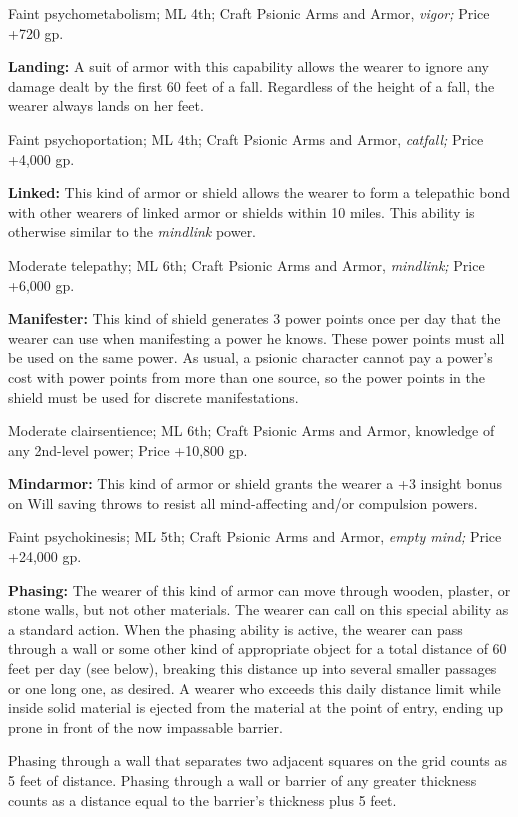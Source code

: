 \documentclass{article}
\begin{document}
Faint psychometabolism; ML 4th; Craft Psionic Arms and Armor, \textit{vigor; }Price 
+720 gp.

\textbf{Landing:} A suit of armor with this capability allows the wearer to ignore 
any damage dealt by the first 60 feet of a fall. Regardless of the height of a 
fall, the wearer always lands on her feet.

Faint psychoportation; ML 4th; Craft Psionic Arms and Armor, \textit{catfall; }Price 
+4,000 gp.

\textbf{Linked:} This kind of armor or shield allows the wearer to form a telepathic 
bond with other wearers of linked armor or shields within 10 miles. This ability 
is otherwise similar to the \textit{mindlink }power.

Moderate telepathy; ML 6th; Craft Psionic Arms and Armor, \textit{mindlink; }Price 
+6,000 gp.

\textbf{Manifester:} This kind of shield generates 3 power points once per day 
that the wearer can use when manifesting a power he knows. These power points must 
all be used on the same power. As usual, a psionic character cannot pay a power's 
cost with power points from more than one source, so the power points in the shield 
must be used for discrete manifestations.

Moderate clairsentience; ML 6th; Craft Psionic Arms and Armor, knowledge of any 
2nd-level power; Price +10,800 gp.

\textbf{Mindarmor:} This kind of armor or shield grants the wearer a +3 insight 
bonus on Will saving throws to resist all mind-affecting and/or compulsion powers.

Faint psychokinesis; ML 5th; Craft Psionic Arms and Armor, \textit{empty mind; 
}Price +24,000 gp.

\textbf{Phasing:} The wearer of this kind of armor can move through wooden, plaster, 
or stone walls, but not other materials. The wearer can call on this special ability 
as a standard action. When the phasing ability is active, the wearer can pass through 
a wall or some other kind of appropriate object for a total distance of 60 feet 
per day (see below), breaking this distance up into several smaller passages or 
one long one, as desired. A wearer who exceeds this daily distance limit while 
inside solid material is ejected from the material at the point of entry, ending 
up prone in front of the now impassable barrier.

Phasing through a wall that separates two adjacent squares on the grid counts as 
5 feet of distance. Phasing through a wall or barrier of any greater thickness 
counts as a distance equal to the barrier's thickness plus 5 feet.
\end{document}
